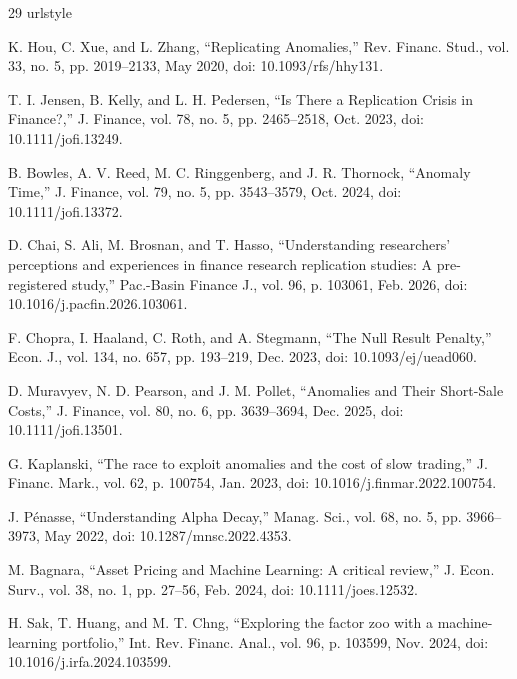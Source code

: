 \documentclass{ieeeaccess}
\begin{document}
\begin{thebibliography}{29}
\providecommand{\url}[1]{#1}
\expandafter\ifx\csname urlstyle\endcsname\relax\else{}\fi

 K. Hou, C. Xue, and L. Zhang, ``Replicating Anomalies,'' Rev. Financ. Stud., vol. 33, no. 5, pp. 2019--2133, May 2020, doi: \url{10.1093/rfs/hhy131}.

 T. I. Jensen, B. Kelly, and L. H. Pedersen, ``Is There a Replication Crisis in Finance?,'' J. Finance, vol. 78, no. 5, pp. 2465--2518, Oct. 2023, doi: \url{10.1111/jofi.13249}.

 B. Bowles, A. V. Reed, M. C. Ringgenberg, and J. R. Thornock, ``Anomaly Time,'' J. Finance, vol. 79, no. 5, pp. 3543--3579, Oct. 2024, doi: \url{10.1111/jofi.13372}.

 D. Chai, S. Ali, M. Brosnan, and T. Hasso, ``Understanding researchers' perceptions and experiences in finance research replication studies: A pre-registered study,'' Pac.-Basin Finance J., vol. 96, p. 103061, Feb. 2026, doi: \url{10.1016/j.pacfin.2026.103061}.

 F. Chopra, I. Haaland, C. Roth, and A. Stegmann, ``The Null Result Penalty,'' Econ. J., vol. 134, no. 657, pp. 193--219, Dec. 2023, doi: \url{10.1093/ej/uead060}.

 D. Muravyev, N. D. Pearson, and J. M. Pollet, ``Anomalies and Their Short-Sale Costs,'' J. Finance, vol. 80, no. 6, pp. 3639--3694, Dec. 2025, doi: \url{10.1111/jofi.13501}.

 G. Kaplanski, ``The race to exploit anomalies and the cost of slow trading,'' J. Financ. Mark., vol. 62, p. 100754, Jan. 2023, doi: \url{10.1016/j.finmar.2022.100754}.

 J. P{\'e}nasse, ``Understanding Alpha Decay,'' Manag. Sci., vol. 68, no. 5, pp. 3966--3973, May 2022, doi: \url{10.1287/mnsc.2022.4353}.

 M. Bagnara, ``Asset Pricing and Machine Learning: A critical review,'' J. Econ. Surv., vol. 38, no. 1, pp. 27--56, Feb. 2024, doi: \url{10.1111/joes.12532}.

 H. Sak, T. Huang, and M. T. Chng, ``Exploring the factor zoo with a machine-learning portfolio,'' Int. Rev. Financ. Anal., vol. 96, p. 103599, Nov. 2024, doi: \url{10.1016/j.irfa.2024.103599}.


\end{thebibliography}
\end{document}
